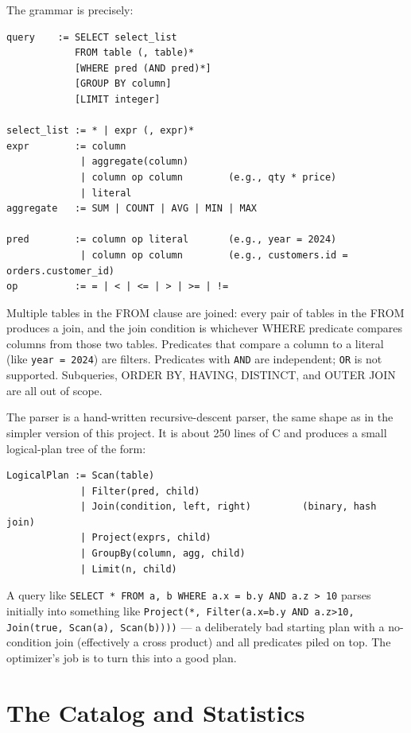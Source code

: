 \documentclass[11pt,a4paper]{article}
\begin{document}
The grammar is precisely:

\begin{codebox}
\begin{lstlisting}
query    := SELECT select_list
            FROM table (, table)*
            [WHERE pred (AND pred)*]
            [GROUP BY column]
            [LIMIT integer]

select_list := * | expr (, expr)*
expr        := column
             | aggregate(column)
             | column op column        (e.g., qty * price)
             | literal
aggregate   := SUM | COUNT | AVG | MIN | MAX

pred        := column op literal       (e.g., year = 2024)
             | column op column        (e.g., customers.id = orders.customer_id)
op          := = | < | <= | > | >= | !=
\end{lstlisting}
\end{codebox}

Multiple tables in the FROM clause are joined: every pair of tables in the FROM produces a join, and the join condition is whichever WHERE predicate compares columns from those two tables. Predicates that compare a column to a literal (like \texttt{year = 2024}) are filters. Predicates with \texttt{AND} are independent; \texttt{OR} is not supported. Subqueries, ORDER BY, HAVING, DISTINCT, and OUTER JOIN are all out of scope.

The parser is a hand-written recursive-descent parser, the same shape as in the simpler version of this project. It is about 250 lines of C and produces a small logical-plan tree of the form:

\begin{codebox}
\begin{lstlisting}
LogicalPlan := Scan(table)
             | Filter(pred, child)
             | Join(condition, left, right)         (binary, hash join)
             | Project(exprs, child)
             | GroupBy(column, agg, child)
             | Limit(n, child)
\end{lstlisting}
\end{codebox}

A query like \texttt{SELECT * FROM a, b WHERE a.x = b.y AND a.z > 10} parses initially into something like \texttt{Project(*, Filter(a.x=b.y AND a.z>10, Join(true, Scan(a), Scan(b))))} --- a deliberately bad starting plan with a no-condition join (effectively a cross product) and all predicates piled on top. The optimizer's job is to turn this into a good plan.

\section{The Catalog and Statistics}
\end{document}
